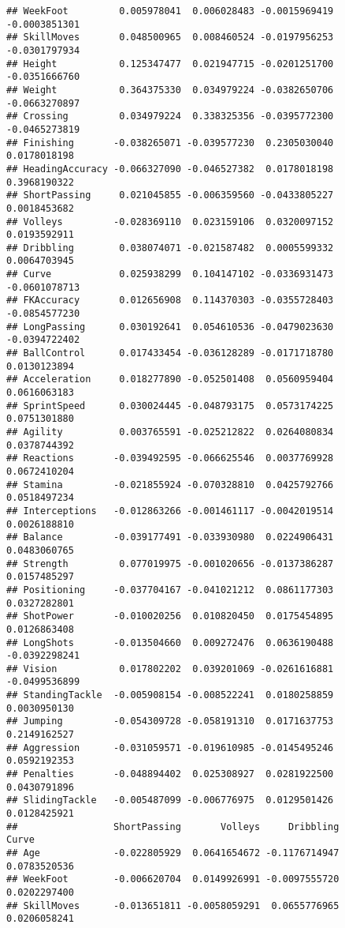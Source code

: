 \documentclass[
]{article}
\begin{document}
\begin{verbatim}
## WeekFoot         0.005978041  0.006028483 -0.0015969419   -0.0003851301
## SkillMoves       0.048500965  0.008460524 -0.0197956253   -0.0301797934
## Height           0.125347477  0.021947715 -0.0201251700   -0.0351666760
## Weight           0.364375330  0.034979224 -0.0382650706   -0.0663270897
## Crossing         0.034979224  0.338325356 -0.0395772300   -0.0465273819
## Finishing       -0.038265071 -0.039577230  0.2305030040    0.0178018198
## HeadingAccuracy -0.066327090 -0.046527382  0.0178018198    0.3968190322
## ShortPassing     0.021045855 -0.006359560 -0.0433805227    0.0018453682
## Volleys         -0.028369110  0.023159106  0.0320097152    0.0193592911
## Dribbling        0.038074071 -0.021587482  0.0005599332    0.0064703945
## Curve            0.025938299  0.104147102 -0.0336931473   -0.0601078713
## FKAccuracy       0.012656908  0.114370303 -0.0355728403   -0.0854577230
## LongPassing      0.030192641  0.054610536 -0.0479023630   -0.0394722402
## BallControl      0.017433454 -0.036128289 -0.0171718780    0.0130123894
## Acceleration     0.018277890 -0.052501408  0.0560959404    0.0616063183
## SprintSpeed      0.030024445 -0.048793175  0.0573174225    0.0751301880
## Agility          0.003765591 -0.025212822  0.0264080834    0.0378744392
## Reactions       -0.039492595 -0.066625546  0.0037769928    0.0672410204
## Stamina         -0.021855924 -0.070328810  0.0425792766    0.0518497234
## Interceptions   -0.012863266 -0.001461117 -0.0042019514    0.0026188810
## Balance         -0.039177491 -0.033930980  0.0224906431    0.0483060765
## Strength         0.077019975 -0.001020656 -0.0137386287    0.0157485297
## Positioning     -0.037704167 -0.041021212  0.0861177303    0.0327282801
## ShotPower       -0.010020256  0.010820450  0.0175454895    0.0126863408
## LongShots       -0.013504660  0.009272476  0.0636190488   -0.0392298241
## Vision           0.017802202  0.039201069 -0.0261616881   -0.0499536899
## StandingTackle  -0.005908154 -0.008522241  0.0180258859    0.0030950130
## Jumping         -0.054309728 -0.058191310  0.0171637753    0.2149162527
## Aggression      -0.031059571 -0.019610985 -0.0145495246    0.0592192353
## Penalties       -0.048894402  0.025308927  0.0281922500    0.0430791896
## SlidingTackle   -0.005487099 -0.006776975  0.0129501426    0.0128425921
##                 ShortPassing       Volleys     Dribbling         Curve
## Age             -0.022805929  0.0641654672 -0.1176714947  0.0783520536
## WeekFoot        -0.006620704  0.0149926991 -0.0097555720  0.0202297400
## SkillMoves      -0.013651811 -0.0058059291  0.0655776965  0.0206058241

\end{verbatim}
\end{document}
